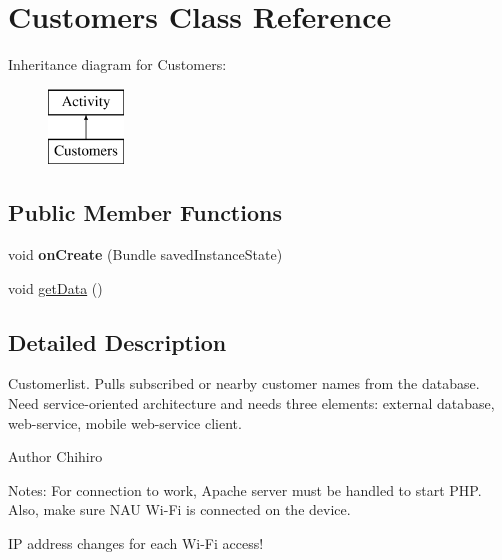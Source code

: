 \hypertarget{classapp_1_1merchant_localization_1_1_customers}{\section{Customers Class Reference}
\label{classapp_1_1merchant_localization_1_1_customers}
}
Inheritance diagram for Customers\-:\begin{figure}[H]
\begin{center}
\leavevmode
\includegraphics[height=2.000000cm]{classapp_1_1merchant_localization_1_1_customers}
\end{center}
\end{figure}
\subsection*{Public Member Functions}
\begin{DoxyCompactItemize}
\item 
\hypertarget{classapp_1_1merchant_localization_1_1_customers_a85e87cb5ced88dff7c8173ecc4f636d1}{void {\bfseries on\-Create} (Bundle saved\-Instance\-State)}\label{classapp_1_1merchant_localization_1_1_customers_a85e87cb5ced88dff7c8173ecc4f636d1}

\item 
void \hyperlink{classapp_1_1merchant_localization_1_1_customers_a63e4aea9eb9a73812933b509b20b82e5}{get\-Data} ()
\end{DoxyCompactItemize}


\subsection{Detailed Description}
Customerlist. Pulls subscribed or nearby customer names from the database. Need service-\/oriented architecture and needs three elements\-: external database, web-\/service, mobile web-\/service client. \begin{DoxyAuthor}{Author}
Chihiro
\end{DoxyAuthor}
Notes\-: For connection to work, Apache server must be handled to start P\-H\-P. Also, make sure N\-A\-U Wi-\/\-Fi is connected on the device.

I\-P address changes for each Wi-\/\-Fi access! 

